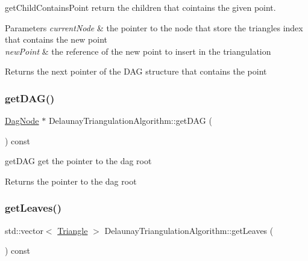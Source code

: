 get\+Child\+Contains\+Point return the children that cointains the given point. 


\begin{DoxyParams}{Parameters}
{\em current\+Node} & the pointer to the node that store the triangle\textquotesingle{}s index that contains the new point \\
\hline
{\em new\+Point} & the reference of the new point to insert in the triangulation \\
\hline
\end{DoxyParams}
\begin{DoxyReturn}{Returns}
the next pointer of the D\+AG structure that contains the point 
\end{DoxyReturn}
\mbox{\label{classDelaunayTriangulationAlgorithm_adc738bca3922d9c21700ebaa62b52c4e}} 
\subsubsection{\texorpdfstring{get\+D\+A\+G()}{getDAG()}}
{\footnotesize\ttfamily \hyperlink{classDagNode}{Dag\+Node} $\ast$ Delaunay\+Triangulation\+Algorithm\+::get\+D\+AG (\begin{DoxyParamCaption}{ }\end{DoxyParamCaption}) const\hspace{0.3cm}{\ttfamily [inline]}}



get\+D\+AG get the pointer to the dag root 

\begin{DoxyReturn}{Returns}
the pointer to the dag root 
\end{DoxyReturn}
\mbox{\label{classDelaunayTriangulationAlgorithm_a50b04497d70c749b3d842553757446aa}} 
\subsubsection{\texorpdfstring{get\+Leaves()}{getLeaves()}}
{\footnotesize\ttfamily std\+::vector$<$ \hyperlink{classTriangle}{Triangle} $>$ Delaunay\+Triangulation\+Algorithm\+::get\+Leaves (\begin{DoxyParamCaption}{ }\end{DoxyParamCaption}) const\hspace{0.3cm}{\ttfamily [inline]}}



